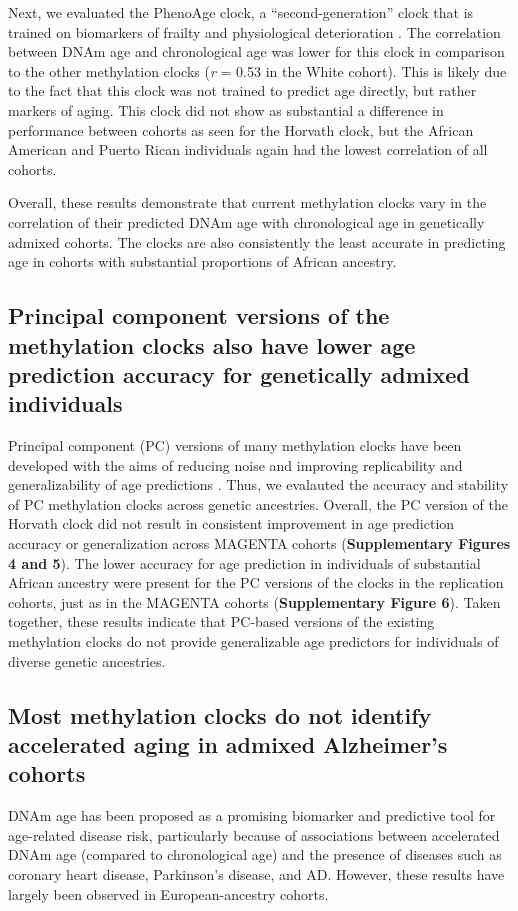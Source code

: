 Next, we evaluated the PhenoAge clock, a ``second-generation'' clock that is trained on biomarkers of frailty and physiological deterioration \citep{levine_epigenetic_2018}. The correlation between DNAm age and chronological age was lower for this clock in comparison to the other methylation clocks (\textit{r} = 0.53 in the White cohort). This is likely due to the fact that this clock was not trained to predict age directly, but rather markers of aging. This clock did not show as substantial a difference in performance between cohorts as seen for the Horvath clock, but the African American and Puerto Rican individuals again had the lowest correlation of all cohorts. 

Overall, these results demonstrate that current methylation clocks vary in the correlation of their predicted DNAm age with chronological age in genetically admixed cohorts. The clocks are also consistently the least accurate in predicting age in cohorts with substantial proportions of African ancestry.

\accuracymultipleclocks

\subsection{Principal component versions of the methylation clocks also have lower age prediction accuracy for genetically admixed individuals}
Principal component (PC) versions of many methylation clocks have been developed with the aims of reducing noise and improving replicability and generalizability of age predictions \citep{higgins-chen_computational_2022}. Thus, we evalauted the accuracy and stability of PC methylation clocks across genetic ancestries. Overall, the PC version of the Horvath clock did not result in consistent improvement in age prediction accuracy or generalization across MAGENTA cohorts (\textbf{Supplementary Figures 4 and 5}). The lower accuracy for age prediction in individuals of substantial African ancestry were present for the PC versions of the clocks in the replication cohorts, just as in the MAGENTA cohorts (\textbf{Supplementary Figure 6}). Taken together, these results indicate that PC-based versions of the existing methylation clocks do not provide generalizable age predictors for individuals of diverse genetic ancestries.


\subsection{Most methylation clocks do not identify accelerated aging in admixed Alzheimer's cohorts}
DNAm age has been proposed as a promising biomarker and predictive tool for age-related disease risk, particularly because of associations between accelerated DNAm age (compared to chronological age) and the presence of diseases such as coronary heart disease, Parkinson's disease, and AD. However, these results have largely been observed in European-ancestry cohorts.

